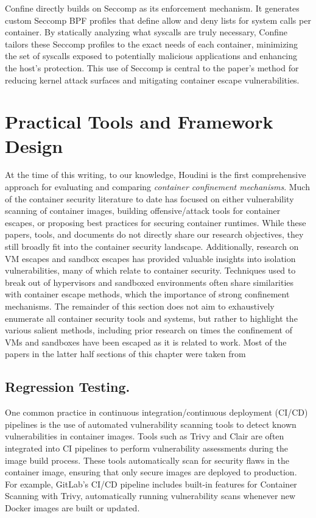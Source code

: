 \documentclass[12pt]{report}
\begin{document}
\begin{doublespace}
Confine directly builds on Seccomp as its enforcement mechanism. It generates custom Seccomp BPF profiles that define allow and deny lists for system calls per container. By statically analyzing what syscalls are truly necessary, Confine tailors these Seccomp profiles to the exact needs of each container, minimizing the set of syscalls exposed to potentially malicious applications and enhancing the host’s protection. This use of Seccomp is central to the paper’s method for reducing kernel attack surfaces and mitigating container escape vulnerabilities.

\section{Practical Tools and Framework Design}

At the time of this writing, to our knowledge, Houdini is the first comprehensive approach for evaluating and comparing \textit{container confinement mechanisms}. Much of the container security literature to date has focused on either vulnerability scanning of container images, building offensive/attack tools for container escapes, or proposing best practices for securing container runtimes. While these papers, tools, and documents do not directly share our research objectives, they still broadly fit into the container security landscape. Additionally, research on VM escapes and sandbox escapes has provided valuable insights into isolation vulnerabilities, many of which relate to container security. Techniques used to break out of hypervisors and sandboxed environments often share similarities with container escape methods, which the importance of strong confinement mechanisms. The remainder of this section does not aim to exhaustively enumerate all container security tools and systems, but rather to highlight the various salient methods, including prior research on times the confinement of VMs and sandboxes have been escaped as it is related to work. Most of the papers in the latter half sections of this chapter were taken from \cite{haq2024sok}

\subsection{Regression Testing.} 

One common practice in continuous integration/continuous deployment (CI/CD) pipelines is the use of automated vulnerability scanning tools to detect known vulnerabilities in container images. Tools such as Trivy \cite{trivy} and Clair \cite{clair} are often integrated into CI pipelines to perform vulnerability assessments during the image build process. These tools automatically scan for security flaws in the container image, ensuring that only secure images are deployed to production. For example, GitLab’s CI/CD pipeline includes built-in features for Container Scanning with Trivy, automatically running vulnerability scans whenever new Docker images are built or updated.


\end{doublespace}
\end{document}
